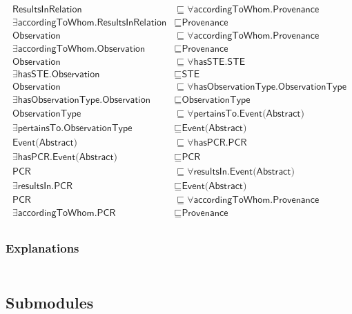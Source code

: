 \begin{align}
  \textsf{ResultsInRelation} &\sqsubseteq \forall \textsf{accordingToWhom.Provenance} \\
  \exists \textsf{accordingToWhom.ResultsInRelation} &\sqsubseteq \textsf{Provenance} \\
  \textsf{Observation} &\sqsubseteq \forall \textsf{accordingToWhom.Provenance} \\
  \exists \textsf{accordingToWhom.Observation} &\sqsubseteq \textsf{Provenance} \\
  \textsf{Observation} &\sqsubseteq \forall \textsf{hasSTE.STE} \\
  \exists \textsf{hasSTE.Observation} &\sqsubseteq \textsf{STE} \\
  \textsf{Observation} &\sqsubseteq \forall \textsf{hasObservationType.ObservationType} \\
  \exists \textsf{hasObservationType.Observation} &\sqsubseteq \textsf{ObservationType} \\
  \textsf{ObservationType} &\sqsubseteq \forall \textsf{pertainsTo.Event(Abstract)} \\
  \exists \textsf{pertainsTo.ObservationType} &\sqsubseteq \textsf{Event(Abstract)} \\
  \textsf{Event(Abstract)} &\sqsubseteq \forall \textsf{hasPCR.PCR} \\
  \exists \textsf{hasPCR.Event(Abstract)} &\sqsubseteq \textsf{PCR} \\
  \textsf{PCR} &\sqsubseteq \forall \textsf{resultsIn.Event(Abstract)} \\
  \exists \textsf{resultsIn.PCR} &\sqsubseteq \textsf{Event(Abstract)} \\
  \textsf{PCR} &\sqsubseteq \forall \textsf{accordingToWhom.Provenance} \\
  \exists \textsf{accordingToWhom.PCR} &\sqsubseteq \textsf{Provenance} \\
\end{align}
\subsubsection{Explanations}
\begin{align}
\end{align}

\subsection{Submodules}
\label{ssec:submodules}


